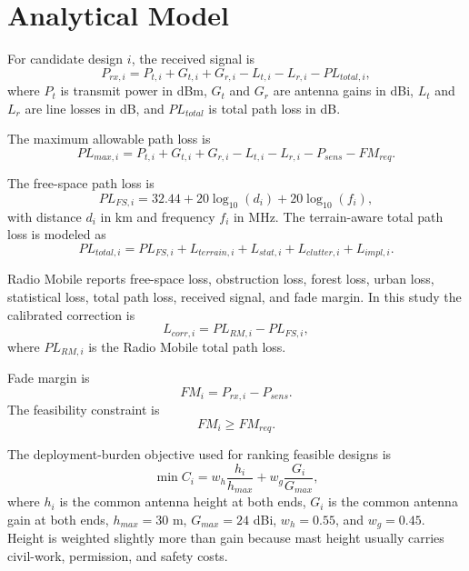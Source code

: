 \documentclass[journal]{IEEEtran}
\begin{document}
\section{Analytical Model}

For candidate design $i$, the received signal is
\begin{equation}
P_{rx,i}=P_{t,i}+G_{t,i}+G_{r,i}-L_{t,i}-L_{r,i}-PL_{total,i},
\end{equation}
where $P_t$ is transmit power in dBm, $G_t$ and $G_r$ are antenna gains in dBi, $L_t$ and $L_r$ are line losses in dB, and $PL_{total}$ is total path loss in dB.

The maximum allowable path loss is
\begin{equation}
PL_{max,i}=P_{t,i}+G_{t,i}+G_{r,i}-L_{t,i}-L_{r,i}-P_{sens}-FM_{req}.
\end{equation}

The free-space path loss is
\begin{equation}
PL_{FS,i}=32.44+20\log_{10}(d_i)+20\log_{10}(f_i),
\end{equation}
with distance $d_i$ in km and frequency $f_i$ in MHz. The terrain-aware total path loss is modeled as
\begin{equation}
PL_{total,i}=PL_{FS,i}+L_{terrain,i}+L_{stat,i}+L_{clutter,i}+L_{impl,i}.
\end{equation}

Radio Mobile reports free-space loss, obstruction loss, forest loss, urban loss, statistical loss, total path loss, received signal, and fade margin. In this study the calibrated correction is
\begin{equation}
L_{corr,i}=PL_{RM,i}-PL_{FS,i},
\end{equation}
where $PL_{RM,i}$ is the Radio Mobile total path loss.

Fade margin is
\begin{equation}
FM_i=P_{rx,i}-P_{sens}.
\end{equation}
The feasibility constraint is
\begin{equation}
FM_i \ge FM_{req}.
\end{equation}

The deployment-burden objective used for ranking feasible designs is
\begin{equation}
\min C_i=w_h\frac{h_i}{h_{max}}+w_g\frac{G_i}{G_{max}},
\end{equation}
where $h_i$ is the common antenna height at both ends, $G_i$ is the common antenna gain at both ends, $h_{max}=30$ m, $G_{max}=24$ dBi, $w_h=0.55$, and $w_g=0.45$. Height is weighted slightly more than gain because mast height usually carries civil-work, permission, and safety costs.
\end{document}
